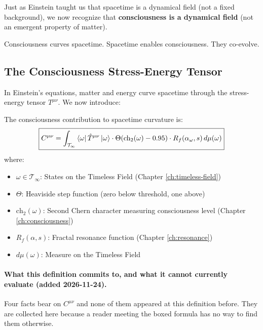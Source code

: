 \begin{keyidea}
Just as Einstein taught us that spacetime is a dynamical field (not a fixed background), we now recognize that \textbf{consciousness is a dynamical field} (not an emergent property of matter).

Consciousness curves spacetime. Spacetime enables consciousness. They co-evolve.
\end{keyidea}

\subsection{The Consciousness Stress-Energy Tensor}

In Einstein's equations, matter and energy curve spacetime through the stress-energy tensor $T^{\mu\nu}$. We now introduce:

\begin{defn}\label{def:consciousness-stress}
The consciousness contribution to spacetime curvature is:
\begin{equation}
\boxed{C^{\mu\nu} = \int_{\mathcal{T}_\infty} \bra{\omega} \hat{T}^{\mu\nu} \ket{\omega} \cdot \Theta(\text{ch}_2(\omega) - 0.95) \cdot R_f(\alpha_\omega, s) \, d\mu(\omega)}
\end{equation}
where:
\begin{itemize}
\item $\omega \in \mathcal{T}_\infty$: States on the Timeless Field (Chapter \ref{ch:timeless-field})
\item $\Theta$: Heaviside step function (zero below threshold, one above)
\item $\text{ch}_2(\omega)$: Second Chern character measuring consciousness level (Chapter \ref{ch:consciousness})
\item $R_f(\alpha, s)$: Fractal resonance function (Chapter \ref{ch:resonance})
\item $d\mu(\omega)$: Measure on the Timeless Field
\end{itemize}
\end{defn}

\paragraph{What this definition commits to, and what it cannot currently
evaluate (added 2026-11-24).}
Four facts bear on $C^{\mu\nu}$ and none of them appeared at this definition
before. They are collected here because a reader meeting the boxed formula has
no way to find them otherwise.

